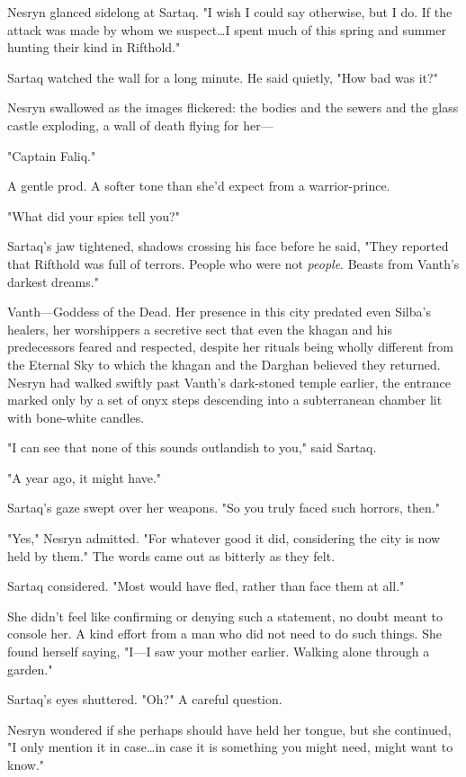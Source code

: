 Nesryn glanced sidelong at Sartaq.
"I wish I could say otherwise, but I do.
If the attack was made by whom we suspect\ldots I spent much of this spring and summer hunting their kind in Rifthold."

Sartaq watched the wall for a long minute.
He said quietly, "How bad was it?"

Nesryn swallowed as the images flickered: the bodies and the sewers and the glass castle exploding, a wall of death flying for her---

"Captain Faliq."

A gentle prod.
A softer tone than she'd expect from a warrior-prince.

"What did your spies tell you?"

Sartaq's jaw tightened, shadows crossing his face before he said, "They reported that Rifthold was full of terrors.
People who were not \emph{people}.
Beasts from Vanth's darkest dreams."

Vanth---Goddess of the Dead.
Her presence in this city predated even Silba's healers, her worshippers a secretive sect that even the khagan and his predecessors feared and respected, despite her rituals being wholly different from the Eternal Sky to which the khagan and the Darghan believed they returned.
Nesryn had walked swiftly past Vanth's dark-stoned temple earlier, the entrance marked only by a set of onyx steps descending into a subterranean chamber lit with bone-white candles.

"I can see that none of this sounds outlandish to you," said Sartaq.

"A year ago, it might have."

Sartaq's gaze swept over her weapons.
"So you truly faced such horrors, then."

"Yes," Nesryn admitted.
"For whatever good it did, considering the city is now held by them."
The words came out as bitterly as they felt.

Sartaq considered.
"Most would have fled, rather than face them at all."

She didn't feel like confirming or denying such a statement, no doubt meant to console her.
A kind effort from a man who did not need to do such things.
She found herself saying, "I---I saw your mother earlier.
Walking alone through a garden."

Sartaq's eyes shuttered.
"Oh?"
A careful question.

Nesryn wondered if she perhaps should have held her tongue, but she continued, "I only mention it in case\ldots in case it is something you might need, might want to know."

